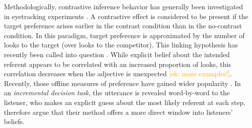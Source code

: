\documentclass[a4paper,man,floatsintext,natbib]{apa6}
\newcommand{\ek}[1]{\textcolor{Orange}{[ek: #1]}}
\begin{document}

Methodologically, contrastive inference behavior has generally been investigated in eyetracking experiments \citep{Sedivy:1999,Ryskin:2019,Aparicio:2016,Rubio-Fernandez:2019,Grodner:2011,Heller:2008}. A contrastive effect is considered to be present if the target preference arises earlier in the contrast condition than in the no-contrast condition. In this paradigm, target preference is approximated by the number of looks to the target (over looks to the competitor). This linking hypothesis has recently been called into question \citep{Qing:2018}. While explicit belief about the intended referent appears to be correlated with an increased proportion of looks, this correlation decreases when the adjective is unexpected \citep{Qing:2018} \ek{more examples!}.\\ 
Recently, those offline measures of preference have gained wider popularity \citep{Qing:2018,Kronmuller:2014, Alsop:2018}. In an \emph{incremental decision task}, the utterance is revealed word-by-word to the listener, who makes an explicit guess about the most likely referent at each step. \citeauthor{Qing:2018} therefore argue that their method offers a more direct window into listeners' beliefs. 
\end{document}
